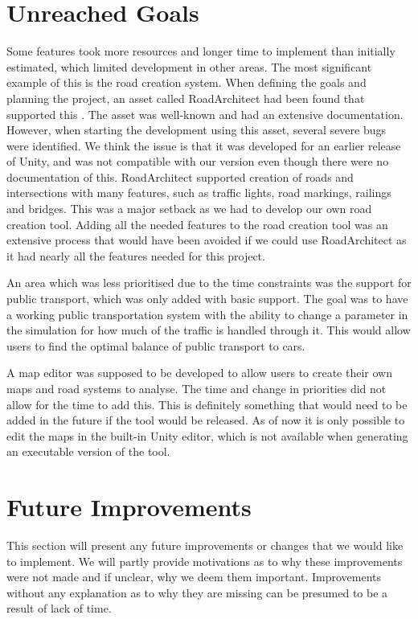 
\section{Unreached Goals}
    Some features took more resources and longer time to implement than initially estimated, which limited development in other areas. The most significant example of this is the road creation system. When defining the goals and planning the project, an asset called RoadArchitect had been found that supported this \cite{road-architect}. The asset was well-known and had an extensive documentation. However, when starting the development using this asset, several severe bugs were identified. We think the issue is that it was developed for an earlier release of Unity, and was not compatible with our version even though there were no documentation of this. RoadArchitect supported creation of roads and intersections with many features, such as traffic lights, road markings, railings and bridges. This was a major setback as we had to develop our own road creation tool. Adding all the needed features to the road creation tool was an extensive process that would have been avoided if we could use RoadArchitect as it had nearly all the features needed for this project.

    An area which was less prioritised due to the time constraints was the support for public transport, which was only added with basic support. The goal was to have a working public transportation system with the ability to change a parameter in the simulation for how much of the traffic is handled through it. This would allow users to find the optimal balance of public transport to cars.

    A map editor was supposed to be developed to allow users to create their own maps and road systems to analyse. The time and change in priorities did not allow for the time to add this. This is definitely something that would need to be added in the future if the tool would be released. As of now it is only possible to edit the maps in the built-in Unity editor, which is not available when generating an executable version of the tool.

\section{Future Improvements}
    This section will present any future improvements or changes that we would like to implement. We will partly provide motivations as to why these improvements were not made and if unclear, why we deem them important. Improvements without any explanation as to why they are missing can be presumed to be a result of lack of time.
    
